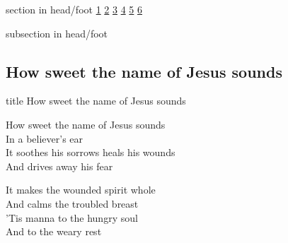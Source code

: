 \documentclass{beamer}
\begin{document}
{
{ 
 {
 \begin{beamercolorbox}[ht=4.5ex,dp=1.5ex,%
      leftskip=.3cm,rightskip=.3cm plus1fil]{section in head/foot}
 \fontsize{12}{25}\selectfont 
\hyperlink{How sweet the name of Jesus sounds[]1}{1}
\hyperlink{How sweet the name of Jesus sounds[]2}{2}
\hyperlink{How sweet the name of Jesus sounds[]3}{3}
\hyperlink{How sweet the name of Jesus sounds[]4}{4}
\hyperlink{How sweet the name of Jesus sounds[]5}{5}
\hyperlink{How sweet the name of Jesus sounds[]6}{6}
 
 \end{beamercolorbox}%
  \begin{beamercolorbox}[ht=2.5ex,dp=1.125ex,%
   leftskip=.3cm,rightskip=.3cm plus1fil]{subsection in head/foot}
   \insertauthor
 \end{beamercolorbox}%
 }
}
\subsection{ How sweet the name of Jesus sounds }

\hypertarget{How sweet the name of Jesus sounds[]}{}
\begin{frame}{}
 \vfill
  \centering
  \begin{beamercolorbox}[sep=8pt,center,shadow=true,rounded=true]{title}
    How sweet the name of Jesus sounds     
  \end{beamercolorbox}
  \vfill
\end{frame}

\hypertarget{How sweet the name of Jesus sounds[]1}{}
\begin{frame}{}
\fontsize{ 18 }{ 23 }\selectfont

How sweet the name of Jesus sounds\\ 
In a believer's ear\\ 
It soothes his sorrows heals his wounds\\ 
And drives away his fear 

\end{frame}

\hypertarget{How sweet the name of Jesus sounds[]2}{}
\begin{frame}{}
\fontsize{ 18 }{ 23 }\selectfont

It makes the wounded spirit whole\\ 
And calms the troubled breast\\ 
'Tis manna to the hungry soul\\ 
And to the weary rest 


\end{frame}}
\end{document}
